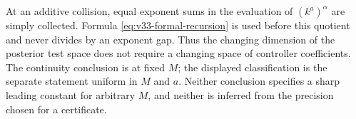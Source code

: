At an additive collision, equal exponent sums in the evaluation of
$(k^a)^\alpha$ are simply collected. Formula
\eqref{eq:v33-formal-recursion} is used before this quotient and
never divides by an exponent gap. Thus the changing dimension of the
posterior test space does not require a changing space of controller
coefficients. The continuity conclusion is at fixed $M$; the displayed
classification is the separate statement uniform in $M$ and $a$.
Neither conclusion specifies a sharp leading constant for arbitrary
$M$, and neither is inferred from the precision chosen for a
certificate.
